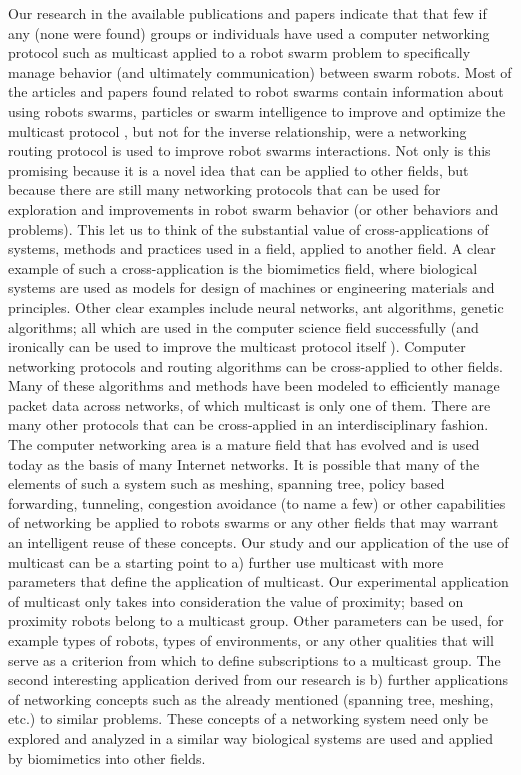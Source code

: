 \documentclass[journal]{IEEEtran}
\begin{document}
Our research in the available publications and papers indicate that that few if any (none were found) groups or individuals have used a computer networking protocol such as multicast applied to a robot swarm problem to specifically manage behavior (and ultimately communication) between swarm robots.
Most of the articles and papers found related to robot swarms contain information about using robots swarms, particles or swarm intelligence to improve and optimize the multicast protocol \cite{IG1}\cite{HH2}\cite{IG3}, but not for the inverse relationship, were a networking routing protocol is used to improve robot swarms interactions. 
Not only is this promising because it is a novel idea that can be applied to other fields, but because there are still many networking protocols that can be used for exploration and improvements in robot swarm behavior (or other behaviors and problems). 
This let us to think of the substantial value of cross-applications of systems, methods and practices used in a field, applied to another field. A clear example of such a cross-application is the biomimetics field, where biological systems are used as models for design of machines or engineering materials and principles. Other clear examples include neural networks, ant algorithms, genetic algorithms; all which are used in the computer science field successfully (and ironically can be used to improve the multicast protocol itself \cite{IG1}\cite{HH2}\cite{IG3}). 
Computer networking protocols and routing algorithms can be cross-applied to other fields. Many of these algorithms and methods have been modeled to efficiently manage packet data across networks, of which multicast is only one of them.  There are many other protocols that can be cross-applied in an interdisciplinary fashion. The computer networking area is a mature field that has evolved and is used today as the basis of many Internet networks. It is possible that many of the elements of such a system such as meshing, spanning tree, policy based forwarding, tunneling, congestion avoidance (to name a few) or other capabilities of networking be applied to robots swarms or any other fields that may warrant an intelligent reuse of these concepts.  Our study and our application of the use of multicast can be a starting point to a) further use multicast with more parameters that define the application of multicast. Our experimental application of multicast only takes into consideration the value of proximity; based on proximity robots belong to a multicast group. Other parameters can be used, for example types of robots, types of environments, or any other qualities that will serve as a criterion from which to define subscriptions to a multicast group. The second interesting application derived from our research is b) further applications of networking concepts such as the already mentioned (spanning tree, meshing, etc.) to similar problems. These concepts of a networking system need only be explored and analyzed in a similar way biological systems are used and applied by biomimetics into other fields. 
\end{document}
